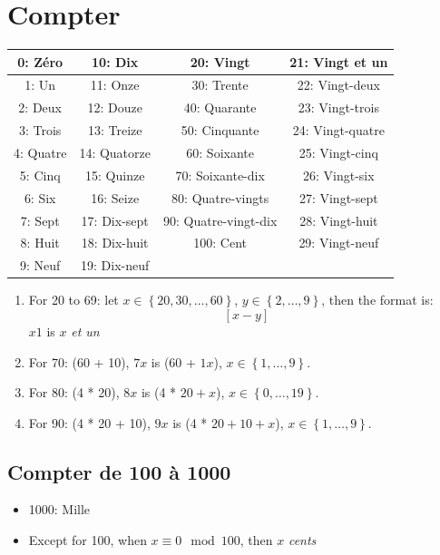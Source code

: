 \documentclass{book}
\begin{document}
\chapter{Compter}
    \begin{center}
        \begin{tabular}{|c|c|c|c|}
            \hline
            0: Zéro & 10: Dix & 20: Vingt & 21: Vingt et un\\
            \hline
            1: Un & 11: Onze & 30: Trente & 22: Vingt-deux \\
            \hline
            2: Deux & 12: Douze & 40: Quarante & 23: Vingt-trois \\
            \hline
            3: Trois & 13: Treize & 50: Cinquante & 24: Vingt-quatre \\
            \hline
            4: Quatre & 14: Quatorze & 60: Soixante & 25: Vingt-cinq \\
            \hline
            5: Cinq & 15: Quinze & 70: Soixante-dix & 26: Vingt-six \\
            \hline
            6: Six & 16: Seize & 80: Quatre-vingts & 27: Vingt-sept \\
            \hline
            7: Sept & 17: Dix-sept & 90: Quatre-vingt-dix & 28: Vingt-huit \\
            \hline
            8: Huit & 18: Dix-huit & 100: Cent & 29: Vingt-neuf \\
            \hline
            9: Neuf & 19: Dix-neuf & & \\
            \hline
        \end{tabular}
    \end{center}
    \begin{enumerate}
        \item For 20 to 69: let $x \in \left\{20, 30, \dots, 60\right\}$, $y \in \left\{ 2, \dots, 9\right\}$, then the format is:
                $$ [x-y] $$
                $x1$ is $x$ \textit{et un}
        \item For 70: (60 + 10), $7x$ is (60 + $1x$), $x \in \left\{1, \dots, 9\right\}$.
        \item For 80: (4 * 20), $8x$ is (4 * $20 + x$), $x \in \left\{0, \dots, 19\right\}$.
        \item For 90: (4 * 20 + 10), $9x$ is (4 * $20 + 10 + x$), $x \in \left\{1, \dots, 9\right\}$.
    \end{enumerate}

    \section{Compter de 100 à 1000}
        \begin{itemize}
            \item 1000: Mille
            \item Except for 100, when $x \equiv 0 \mod 100$, then $x$ \textit{cents} 
        \end{itemize}
    
\end{document}
